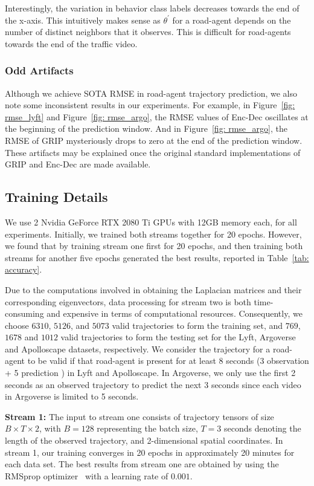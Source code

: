 \documentclass[10pt,twocolumn,letterpaper]{article}
\theoremstyle{plain}
\begin{document}
Interestingly, the variation in behavior class labels decreases towards the end of the x-axis. This intuitively makes sense as $\theta^{'}$ for a road-agent depends on the number of distinct neighbors that it observes. This is difficult for road-agents towards the end of the traffic video.
\subsubsection{Odd Artifacts}
Although we achieve SOTA RMSE in road-agent trajectory prediction, we also note some inconsistent results in our experiments. For example, in Figure~\ref{fig: rmse_lyft} and Figure~\ref{fig: rmse_argo}, the RMSE values of Enc-Dec oscillates at the beginning of the prediction window. And in Figure~\ref{fig: rmse_argo}, the RMSE of GRIP mysteriously drops to zero at the end of the prediction window. These artifacts may be explained once the original standard implementations of GRIP and Enc-Dec are made available.



\subsection{Training Details}
\label{subsec: implementation}
We use 2 Nvidia GeForce RTX 2080 Ti GPUs with 12GB memory each, for all experiments. Initially, we trained both streams together for 20 epochs. However, we found that by training stream one first for 20 epochs, and then training both streams for another five epochs generated the best results, reported in Table~\ref{tab: accuracy}.

Due to the computations involved in obtaining the Laplacian matrices and their corresponding eigenvectors, data processing for stream two is both time-consuming and expensive in terms of computational resources. Consequently, we choose $6310$, $5126$, and $5073$ valid trajectories to form the training set, and $769$, $1678$ and $1012$ valid trajectories to form the testing set for the Lyft, Argoverse and Apolloscape datasets, respectively. We consider the trajectory for a road-agent to be valid if that road-agent is present for at least 8 seconds (3 observation + 5 prediction ) in Lyft and Apolloscape. In Argoverse, we only use the first 2 seconds as an observed trajectory to predict the next 3 seconds since each video in Argoverse is limited to 5 seconds. 





\textbf{Stream 1: }The input to stream one consists of trajectory tensors of size $B\times T \times 2$, with $B=128$ representing the batch size, $T=3$ seconds denoting the length of the observed trajectory, and 2-dimensional spatial coordinates. In stream 1, our training converges in 20 epochs in approximately 20 minutes for each data set. The best results from stream one are obtained by using the RMSprop optimizer~\cite{rmsprop} with a learning rate of $0.001$.
\end{document}
